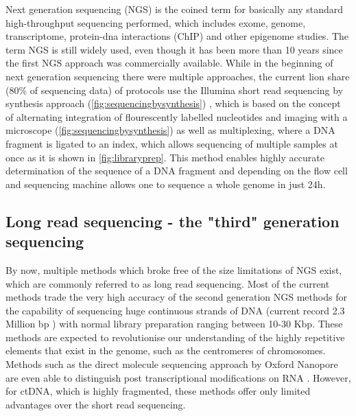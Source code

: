 Next generation sequencing (NGS) is the coined term for basically any standard high-throughput sequencing performed, which includes exome, genome, transcriptome, \linebreak protein-dna interactions (ChIP) and other epigenome studies. The term NGS is still widely used, even though it has been more than 10 years since the first NGS approach was commercially available. While in the beginning of next generation sequencing there were multiple approaches, the current lion share (80\% of sequencing data) of protocols use the Illumina short read sequencing by synthesis approach (\autoref{fig:sequencingbysynthesis}) \cite{Mardis2008,Straiton2019}, which is based on the concept of alternating integration of flourescently labelled nucleotides and imaging with a microscope (\autoref{fig:sequencingbysynthesis}) as well as multiplexing, where a DNA fragment is ligated to an index, which allows sequencing of multiple samples at once \cite{Church1984,Church1988} as it is shown in \autoref{fig:libraryprep}. This method enables highly accurate determination of the sequence of a DNA fragment and depending on the flow cell and sequencing machine allows one to sequence a whole genome in just 24h.

\subsection[Long read sequencing]{Long read sequencing - the "third" generation sequencing}
\label{intro-sec:lrs}
By now, multiple methods which broke free of the size limitations of NGS exist, which are commonly referred to as long read sequencing. Most of the current methods trade the very high accuracy of the second generation NGS methods for the capability of sequencing huge continuous strands of DNA (current record 2.3 Million bp \cite{Payne2018}) with normal library preparation ranging between 10-30 Kbp. 
These methods are expected to revolutionise our understanding of the highly repetitive elements that exist in the genome, such as the centromeres of chromosomes. Methods such as the direct molecule sequencing approach by Oxford Nanopore are even able to distinguish post transcriptional modifications on RNA \cite{Pratanwanich2021}.
However, for ctDNA, which is highly fragmented, these methods offer only limited advantages over the short read sequencing.

